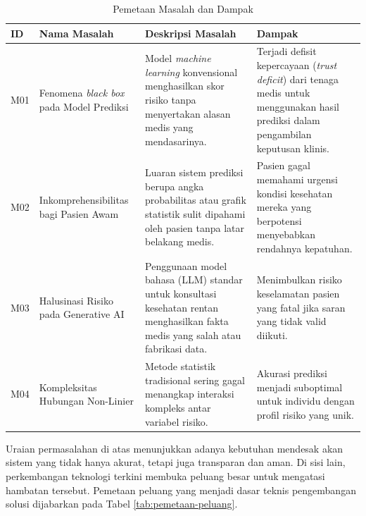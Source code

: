 \begin{table}[H]
    \caption{Pemetaan Masalah dan Dampak}
    \label{tab:pemetaan-masalah}
    \centering
    \small
    \begin{tabular}{|p{1cm}|p{3.5cm}|p{4.5cm}|p{4cm}|}
        \hline
        \textbf{ID} & \textbf{Nama Masalah} &\textbf{Deskripsi Masalah} & \textbf{Dampak} \\
        \hline
        M01 & Fenomena \textit{black box} pada Model Prediksi & Model \textit{machine learning} konvensional menghasilkan skor risiko tanpa menyertakan alasan medis yang mendasarinya. & Terjadi defisit kepercayaan (\emph{trust deficit}) dari tenaga medis untuk menggunakan hasil prediksi dalam pengambilan keputusan klinis. \\
        \hline
        M02 & Inkomprehensibilitas bagi Pasien Awam & Luaran sistem prediksi berupa angka probabilitas atau grafik statistik sulit dipahami oleh pasien tanpa latar belakang medis. & Pasien gagal memahami urgensi kondisi kesehatan mereka yang berpotensi menyebabkan rendahnya kepatuhan. \\
        \hline
        M03 & Halusinasi Risiko pada Generative AI & Penggunaan model bahasa (LLM) standar untuk konsultasi kesehatan rentan menghasilkan fakta medis yang salah atau fabrikasi data. & Menimbulkan risiko keselamatan pasien yang fatal jika saran yang tidak valid diikuti. \\
        \hline
        M04 & Kompleksitas Hubungan Non-Linier & Metode statistik tradisional sering gagal menangkap interaksi kompleks antar variabel risiko. & Akurasi prediksi menjadi suboptimal untuk individu dengan profil risiko yang unik. \\
        \hline
    \end{tabular}
\end{table}

Uraian permasalahan di atas menunjukkan adanya kebutuhan mendesak akan sistem yang tidak hanya akurat, tetapi juga transparan dan aman. Di sisi lain, perkembangan teknologi terkini membuka peluang besar untuk mengatasi hambatan tersebut. Pemetaan peluang yang menjadi dasar teknis pengembangan solusi dijabarkan pada Tabel \ref{tab:pemetaan-peluang}.

